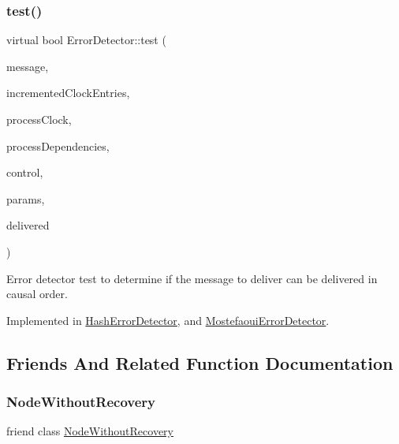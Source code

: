 \subsubsection{\texorpdfstring{test()}{test()}}
{\footnotesize\ttfamily virtual bool Error\+Detector\+::test (\begin{DoxyParamCaption}\item[{\hyperlink{structures_8h_a7e7bdc1d2fff8a9436f2f352b2711ed6}{message\+Info}}]{message,  }\item[{const vector$<$ unsigned int $>$ \&}]{incremented\+Clock\+Entries,  }\item[{const \hyperlink{class_probabilistic_clock}{Probabilistic\+Clock} \&}]{process\+Clock,  }\item[{const \hyperlink{class_total_dependencies}{Total\+Dependencies} \&}]{process\+Dependencies,  }\item[{\hyperlink{class_controller}{Controller} $\ast$}]{control,  }\item[{\hyperlink{class_simulation_parameters}{Simulation\+Parameters} $\ast$}]{params,  }\item[{const vector$<$ \hyperlink{structures_8h_a7e7bdc1d2fff8a9436f2f352b2711ed6}{message\+Info} $>$ \&}]{delivered }\end{DoxyParamCaption})\hspace{0.3cm}{\ttfamily [pure virtual]}}



Error detector test to determine if the message to deliver can be delivered in causal order. 



Implemented in \hyperlink{class_hash_error_detector_a1c7fe649a34cf7e139ce53a248dce748}{Hash\+Error\+Detector}, and \hyperlink{class_mostefaoui_error_detector_a293f6cf144526bc8694fc4f1fc0daeb5}{Mostefaoui\+Error\+Detector}.



\subsection{Friends And Related Function Documentation}
\mbox{\label{class_error_detector_aa0495b79e94b09962892b921ae370e57}} 
\subsubsection{\texorpdfstring{Node\+Without\+Recovery}{NodeWithoutRecovery}}
{\footnotesize\ttfamily friend class \hyperlink{class_node_without_recovery}{Node\+Without\+Recovery}\hspace{0.3cm}{\ttfamily [friend]}}

